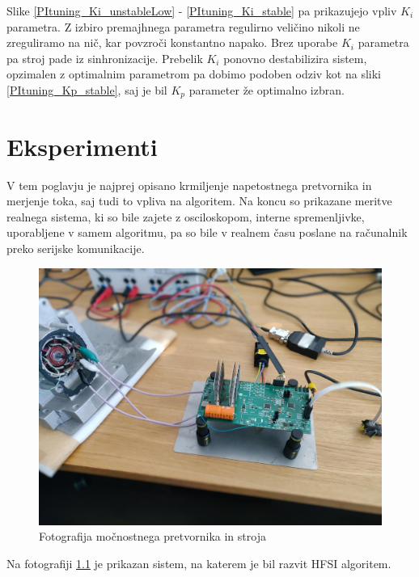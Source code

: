 \documentclass[a4paper,twoside,openright,12pt,slovene]{book}
\begin{document}
Slike \ref{PItuning_Ki_unstableLow} - \ref{PItuning_Ki_stable} pa prikazujejo vpliv $K_i$ parametra. Z izbiro premajhnega parametra regulirno veličino nikoli ne zreguliramo na nič, kar povzroči
konstantno napako. Brez uporabe $K_i$ parametra pa stroj pade iz sinhronizacije. Prebelik $K_i$ ponovno destabilizira sistem, opzimalen z optimalnim parametrom pa dobimo podoben odziv kot na sliki 
\ref{PItuning_Kp_stable}, saj je bil $K_p$ parameter že optimalno izbran.


\chapter{Eksperimenti}  \label{eksperimenti}

V tem poglavju je najprej opisano krmiljenje napetostnega pretvornika in merjenje toka, saj tudi to vpliva na algoritem. Na koncu so prikazane meritve realnega sistema, ki so bile zajete z
osciloskopom, interne spremenljivke, uporabljene v samem algoritmu, pa so bile v realnem času poslane na računalnik preko serijske komunikacije.

\begin{figure}[!htbp]
    \centering
    \includegraphics[width=0.75\columnwidth]{Slike/EksperimentiSlika.jpg}
    \caption{\label{experimentiSlika} Fotografija močnostnega pretvornika in stroja}
\end{figure}

Na fotografiji \ref{experimentiSlika} je prikazan sistem, na katerem je bil razvit HFSI algoritem. 
\end{document}
